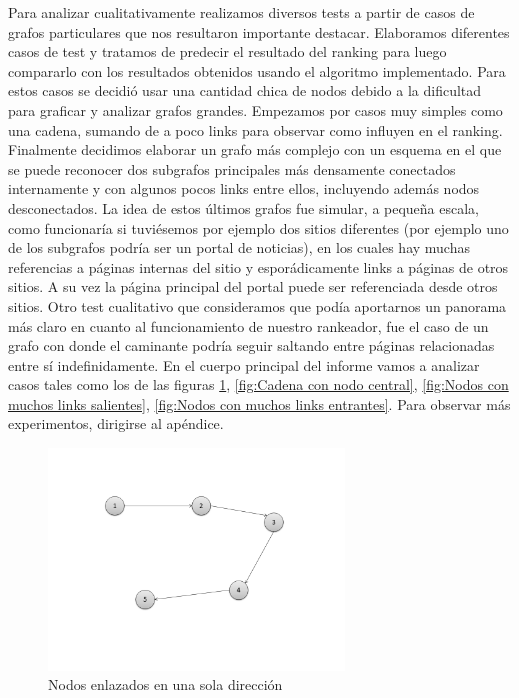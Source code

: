 \par
Para analizar cualitativamente realizamos diversos tests a partir de casos de grafos particulares que nos resultaron importante destacar.
Elaboramos diferentes casos de test y tratamos de predecir el resultado del ranking para luego compararlo con los resultados obtenidos usando el algoritmo implementado. Para estos casos se decidió usar una cantidad chica de nodos debido a la dificultad para graficar y analizar grafos grandes.
Empezamos por casos muy simples como una cadena, sumando de a poco links para observar como influyen en el ranking.
Finalmente decidimos elaborar un grafo m\'as complejo con un esquema en el que se puede reconocer dos subgrafos principales m\'as densamente conectados internamente y con algunos pocos links entre ellos, incluyendo además nodos desconectados. La idea de estos últimos grafos fue simular, a pequeña escala, como funcionaría si tuviésemos por ejemplo dos sitios diferentes (por ejemplo uno de los subgrafos podría ser un portal de noticias), en los cuales hay muchas referencias a p\'aginas internas del sitio y espor\'adicamente links a p\'aginas de otros sitios. A su vez la p\'agina principal del portal puede ser referenciada desde otros sitios.
Otro test cualitativo que consideramos que pod\'ia aportarnos un panorama m\'as claro en cuanto al funcionamiento de nuestro rankeador, fue el caso de un grafo con donde el caminante podr\'ia seguir saltando entre p\'aginas relacionadas entre s\'i indefinidamente.
En el cuerpo principal del informe vamos a analizar casos tales como los de las figuras \ref{fig:Cadena simple}, \ref{fig:Cadena con nodo central}, \ref{fig:Nodos con muchos links salientes}, \ref{fig:Nodos con muchos links entrantes}. Para observar m\'as experimentos, dirigirse al ap\'endice.

\begin{figure}[H]
	\centering
	\includegraphics[width=0.7\textwidth]{img/cadena4.png}
	\caption{Nodos enlazados en una sola dirección}
	\label{fig:Cadena simple}
\end{figure}



